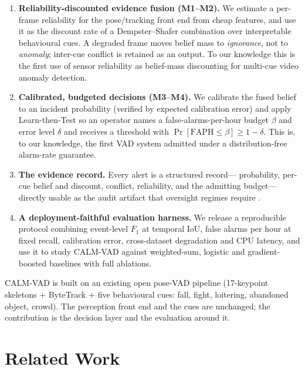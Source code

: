 \documentclass[conference]{IEEEtran}
\newcommand{\faph}{\mathrm{FAPH}}
\newcommand{\method}{CALM-VAD}
\begin{document}
\begin{enumerate}
\item \textbf{Reliability-discounted evidence fusion (M1--M2).} We estimate a
per-frame reliability for the pose/tracking front end from cheap features, and
use it as the discount rate of a Dempster--Shafer combination over
interpretable behavioural cues. A degraded frame moves belief mass to
\emph{ignorance}, not to \emph{anomaly}; inter-cue conflict is retained as an
output. To our knowledge this is the first use of sensor reliability as
belief-mass discounting for multi-cue video anomaly detection.
\item \textbf{Calibrated, budgeted decisions (M3--M4).} We calibrate the fused
belief to an incident probability (verified by expected calibration error) and
apply Learn-then-Test \cite{angelopoulos2021ltt} so an operator names a
false-alarms-per-hour budget $\beta$ and error level $\delta$ and receives a
threshold with $\Pr[\faph \le \beta]\ge 1-\delta$. This is, to our knowledge,
the first VAD system admitted under a distribution-free alarm-rate guarantee.
\item \textbf{The evidence record.} Every alert is a structured record---
probability, per-cue belief and discount, conflict, reliability, and the
admitting budget---directly usable as the audit artifact that oversight
regimes require \cite{euaiact2024}.
\item \textbf{A deployment-faithful evaluation harness.} We release a
reproducible protocol combining event-level $F_1$ at temporal IoU, false
alarms per hour at fixed recall, calibration error, cross-dataset degradation
and CPU latency, and use it to study \method{} against weighted-sum, logistic
and gradient-boosted baselines with full ablations.
\end{enumerate}

\method{} is built on an existing open pose-VAD pipeline (17-keypoint skeletons
\cite{ultralytics2023} + ByteTrack \cite{bytetrack2022} + five behavioural
cues: fall, fight, loitering, abandoned object, crowd). The perception front
end and the cues are unchanged; the contribution is the decision layer and the
evaluation around it.

\section{Related Work}
\end{document}
